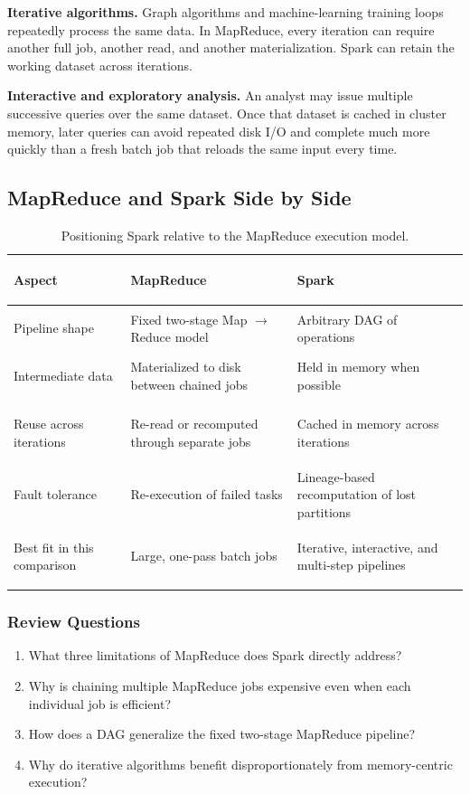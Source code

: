 \documentclass[11pt,a4paper,oneside]{book}
\begin{document}
\textbf{Iterative algorithms.} Graph algorithms and machine-learning training loops repeatedly process the same data. In MapReduce, every iteration can require another full job, another read, and another materialization. Spark can retain the working dataset across iterations.

\textbf{Interactive and exploratory analysis.} An analyst may issue multiple successive queries over the same dataset. Once that dataset is cached in cluster memory, later queries can avoid repeated disk I/O and complete much more quickly than a fresh batch job that reloads the same input every time.

\subsection{MapReduce and Spark Side by Side}

\begin{table}[htbp]
\centering
\caption{Positioning Spark relative to the MapReduce execution model.}
\label{tab:mapreduce-spark-positioning}
\begin{tabularx}{\textwidth}{>{\bfseries\raggedright\arraybackslash}p{3.2cm} Y Y}
\toprule
{}
Aspect & MapReduce & Spark \\
\midrule
Pipeline shape & Fixed two-stage Map $\rightarrow$ Reduce model & Arbitrary DAG of operations \\
Intermediate data & Materialized to disk between chained jobs & Held in memory when possible \\
Reuse across iterations & Re-read or recomputed through separate jobs & Cached in memory across iterations \\
Fault tolerance & Re-execution of failed tasks & Lineage-based recomputation of lost partitions \\
Best fit in this comparison & Large, one-pass batch jobs & Iterative, interactive, and multi-step pipelines \\
\bottomrule
\end{tabularx}
\end{table}

\subsubsection*{Review Questions}
\begin{enumerate}
    \item What three limitations of MapReduce does Spark directly address?
    \item Why is chaining multiple MapReduce jobs expensive even when each individual job is efficient?
    \item How does a DAG generalize the fixed two-stage MapReduce pipeline?
    \item Why do iterative algorithms benefit disproportionately from memory-centric execution?
\end{enumerate}
\end{document}
